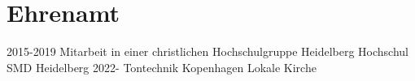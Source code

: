 \documentclass[]{friggeri-cv}
\begin{document}
\section{Ehrenamt}
\begin{entrylist}
  \entry
    {2015-2019}
    {Mitarbeit in einer christlichen Hochschulgruppe}
    {Heidelberg}
    {Hochschul SMD Heidelberg}
  \entry
    {2022-}
    {Tontechnik}
    {Kopenhagen}
    {Lokale Kirche}    
\end{entrylist}


%
%
\end{document}
